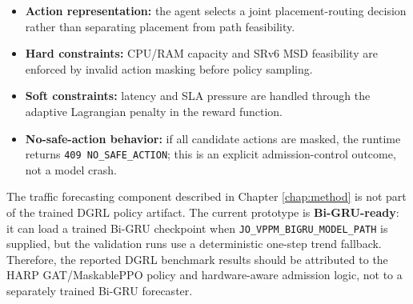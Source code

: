 \documentclass[12pt, a4paper, reqno, oneside]{book}
\begin{document}
\begin{itemize}
    \item \textbf{Action representation:} the agent selects a joint placement-routing decision rather than separating placement from path feasibility.
    \item \textbf{Hard constraints:} CPU/RAM capacity and SRv6 MSD feasibility are enforced by invalid action masking before policy sampling.
    \item \textbf{Soft constraints:} latency and SLA pressure are handled through the adaptive Lagrangian penalty in the reward function.
    \item \textbf{No-safe-action behavior:} if all candidate actions are masked, the runtime returns \texttt{409 NO\_SAFE\_ACTION}; this is an explicit admission-control outcome, not a model crash.
\end{itemize}

The traffic forecasting component described in Chapter \ref{chap:method} is not part of the trained DGRL policy artifact. The current prototype is \textbf{Bi-GRU-ready}: it can load a trained Bi-GRU checkpoint when \texttt{JO\_VPPM\_BIGRU\_MODEL\_PATH} is supplied, but the validation runs use a deterministic one-step trend fallback. Therefore, the reported DGRL benchmark results should be attributed to the HARP GAT/MaskablePPO policy and hardware-aware admission logic, not to a separately trained Bi-GRU forecaster.

\newpage
{} 
\printbibliography
\end{document}
